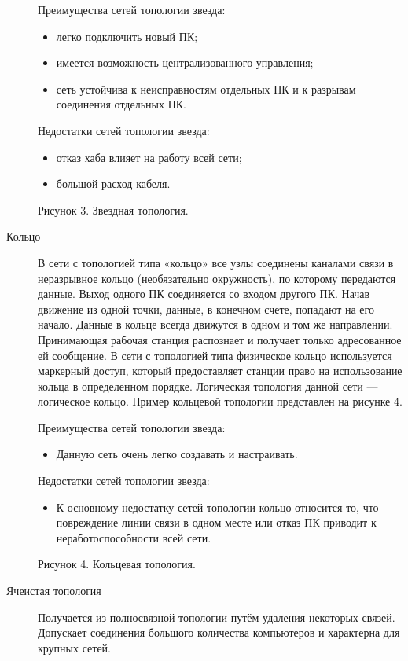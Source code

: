 \begin{description}
  Преимущества сетей топологии звезда:
  \begin{itemize}
  \item легко подключить новый ПК;
  \item имеется возможность централизованного управления;
  \item сеть устойчива к неисправностям отдельных ПК и к разрывам соединения отдельных ПК.
  \end{itemize}

  Недостатки сетей топологии звезда:
  \begin{itemize}
  \item отказ хаба влияет на работу всей сети;
  \item большой расход кабеля.
  \end{itemize}
  
  Рисунок 3. Звездная топология.

\item[Кольцо]
  В сети с топологией типа «кольцо» все узлы соединены каналами связи в неразрывное кольцо (необязательно окружность), по которому передаются данные. Выход одного ПК соединяется со входом другого ПК. Начав движение из одной точки, данные, в конечном счете, попадают на его начало. Данные в кольце всегда движутся в одном и том же направлении.
  Принимающая рабочая станция распознает и получает только адресованное ей сообщение. В сети с топологией типа физическое кольцо используется маркерный доступ, который предоставляет станции право на использование кольца в определенном порядке. Логическая топология данной сети — логическое кольцо. Пример кольцевой топологии представлен на рисунке 4.

  Преимущества сетей топологии звезда:
  \begin{itemize}
  \item Данную сеть очень легко создавать и настраивать.
  \end{itemize}

  Недостатки сетей топологии звезда:
  \begin{itemize}
  \item К основному недостатку сетей топологии кольцо относится то, что повреждение линии связи в одном месте или отказ ПК приводит к неработоспособности всей сети.
  \end{itemize}

  Рисунок 4. Кольцевая топология.

\item[Ячеистая топология]
  Получается из полносвязной топологии путём удаления некоторых связей. Допускает соединения большого количества компьютеров и характерна для крупных сетей.


\end{description}
